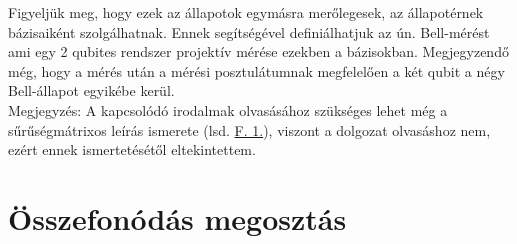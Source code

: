 Figyeljük meg, hogy ezek az állapotok egymásra merőlegesek, az állapotérnek bázisaiként szolgálhatnak. Ennek segítségével definiálhatjuk az ún. Bell-mérést ami egy 2 qubites rendszer projektív mérése ezekben a bázisokban. Megjegyzendő még, hogy a mérés után a mérési posztulátumnak megfelelően a két qubit a négy Bell-állapot egyikébe kerül.\\
Megjegyzés: A kapcsolódó irodalmak olvasásához szükséges lehet még a sűrűségmátrixos leírás ismerete (lsd. \hyperref[suru]{F. 1.}), viszont a dolgozat olvasáshoz nem, ezért ennek ismertetésétől eltekintettem.\\

\section{Összefonódás megosztás}

